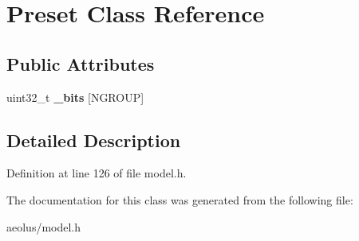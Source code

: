 \hypertarget{class_preset}{}\section{Preset Class Reference}
\label{class_preset}
\subsection*{Public Attributes}
\begin{DoxyCompactItemize}
\item 
\mbox{\label{class_preset_aa748d6a8126c705704cd6776b2087e3f}} 
uint32\+\_\+t {\bfseries \+\_\+bits} \mbox{[}N\+G\+R\+O\+UP\mbox{]}
\end{DoxyCompactItemize}


\subsection{Detailed Description}


Definition at line 126 of file model.\+h.



The documentation for this class was generated from the following file\+:\begin{DoxyCompactItemize}
\item 
aeolus/model.\+h\end{DoxyCompactItemize}
